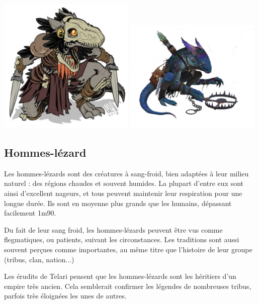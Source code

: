 \documentclass[10pt,a4paper]{book}
\newcommand{\nomorigine}{Telari }
\begin{document}
\includegraphics[width=0.49\textwidth]{kobold 2}
\includegraphics[width=0.49\textwidth]{kobold 3}
\subsection{Hommes-lézard}
Les hommes-lézards sont des créatures à sang-froid, bien adaptées à leur milieu naturel : des régions chaudes et souvent humides. La plupart d'entre eux sont ainsi d'excellent nageurs, et tous peuvent maintenir leur respiration pour une longue durée. Ils sont en moyenne plus grands que les humains, dépassant facilement 1m90.

Du fait de leur sang froid, les hommes-lézards peuvent être vus comme flegmatiques, ou patients, suivant les circonstances. Les traditions sont aussi souvent perçues comme importantes, au même titre que l'histoire de leur groupe (tribus, clan, nation...)

Les érudits de \nomorigine pensent que les hommes-lézards sont les héritiers d'un empire très ancien. Cela semblerait confirmer les légendes de nombreuses tribus, parfois très éloignées les unes de autres.
\end{document}
